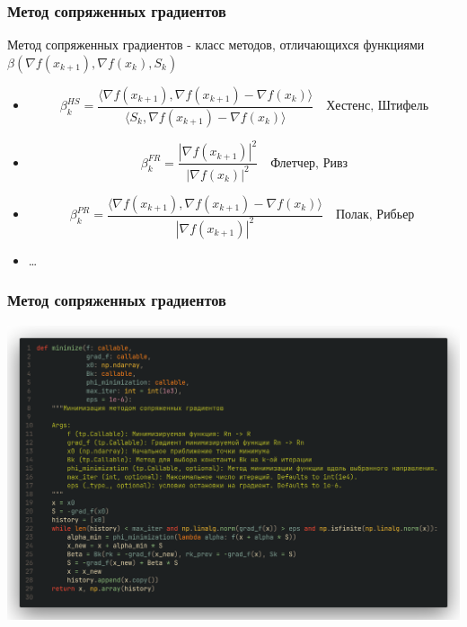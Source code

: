\documentclass[9pt]{beamer}
\begin{document}
\begin{frame}
    \frametitle{Метод сопряженных градиентов}
    Метод сопряженных градиентов - класс методов, отличающихся функциями $\beta(\nabla f(x_{k+1}), \nabla f(x_{k}), S_{k})$
    \begin{itemize}
        \item $$\beta_k^{HS} = \frac{\langle \nabla f(x_{k + 1}), \nabla f(x_{k + 1}) - \nabla f(x_{k}) \rangle}{\langle S_k, \nabla f(x_{k + 1}) - \nabla f(x_{k}) \rangle} \quad \text{Хестенс, Штифель}$$
        \item $$\beta_k^{FR} = \frac{|\nabla f(x_{k + 1})|^2}{|\nabla f(x_{k})|^2} \quad \text{Флетчер, Ривз}$$
        \item $$\beta_k^{PR} = \frac{\langle \nabla f(x_{k + 1}), \nabla f(x_{k + 1}) - \nabla f(x_{k}) \rangle}{|\nabla f(x_{k + 1})|^2} \quad \text{Полак, Рибьер }$$
        \item \dots
    \end{itemize}
\end{frame}

\begin{frame}
    \frametitle{Метод сопряженных градиентов}
    \begin{center}
        \includegraphics[width=1\textwidth]{code_gradient.png}    
    \end{center}
\end{frame}
\end{document}
